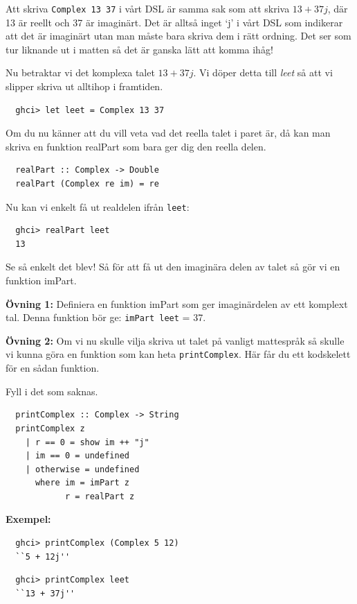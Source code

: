 \documentclass{article}
\begin{document}
Att skriva \texttt{Complex 13 37} i vårt DSL är samma sak som att
skriva $13 + 37j$, där 13 är reellt och 37 är imaginärt.
Det är alltså inget ‘j’ i vårt DSL som indikerar att det är imaginärt utan man
måste bara skriva dem i rätt ordning.
Det ser som tur liknande ut i matten så det är ganska lätt att komma ihåg!

Nu betraktar vi det komplexa talet $13+37j$.
Vi döper detta till \emph{leet} så att vi slipper skriva ut alltihop i framtiden.
\begin{verbatim}
  ghci> let leet = Complex 13 37
\end{verbatim}
Om du nu känner att du vill veta vad det reella talet i paret är,
då kan man skriva en funktion realPart som bara ger dig den reella delen.
\begin{verbatim}
  realPart :: Complex -> Double
  realPart (Complex re im) = re
\end{verbatim}

Nu kan vi enkelt få ut realdelen ifrån \texttt{leet}:
\begin{verbatim}
  ghci> realPart leet
  13
\end{verbatim}

Se så enkelt det blev! Så för att få ut den imaginära delen av talet så gör vi
en funktion imPart.

\textbf{Övning 1:} Definiera en funktion imPart som ger imaginärdelen av ett
komplext tal. Denna funktion bör ge: \texttt{imPart leet} = 37.

\textbf{Övning 2:} Om vi nu skulle vilja skriva ut talet på vanligt mattespråk så
skulle vi kunna göra en funktion som kan heta \texttt{printComplex}.
Här får du ett kodskelett för en sådan funktion.

Fyll i det som saknas.
\begin{verbatim}
  printComplex :: Complex -> String
  printComplex z
    | r == 0 = show im ++ "j"
    | im == 0 = undefined
    | otherwise = undefined
      where im = imPart z
            r = realPart z
\end{verbatim}

\textbf{Exempel:}
\begin{verbatim}
  ghci> printComplex (Complex 5 12)
  ``5 + 12j''
\end{verbatim}

\begin{verbatim}
  ghci> printComplex leet
  ``13 + 37j''
\end{verbatim}
\end{document}
